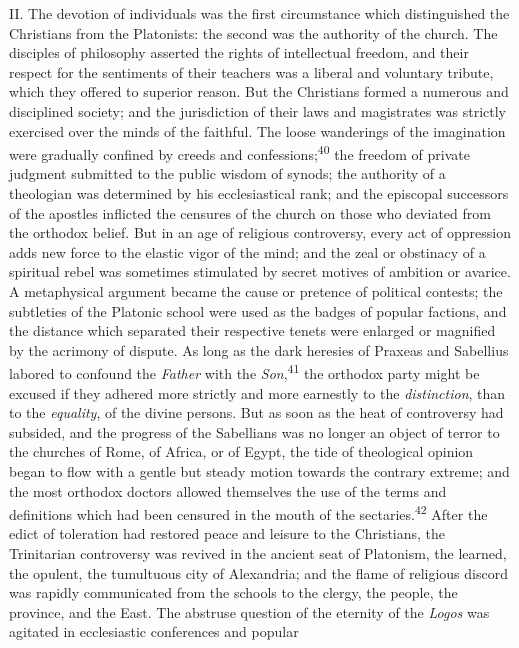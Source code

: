 II. The devotion of individuals was the first circumstance which
distinguished the Christians from the Platonists: the second was
the authority of the church. The disciples of philosophy asserted
the rights of intellectual freedom, and their respect for the
sentiments of their teachers was a liberal and voluntary tribute,
which they offered to superior reason. But the Christians formed
a numerous and disciplined society; and the jurisdiction of their
laws and magistrates was strictly exercised over the minds of the
faithful. The loose wanderings of the imagination were gradually
confined by creeds and confessions;\textsuperscript{40} the freedom of private
judgment submitted to the public wisdom of synods; the authority
of a theologian was determined by his ecclesiastical rank; and
the episcopal successors of the apostles inflicted the censures
of the church on those who deviated from the orthodox belief. But
in an age of religious controversy, every act of oppression adds
new force to the elastic vigor of the mind; and the zeal or
obstinacy of a spiritual rebel was sometimes stimulated by secret
motives of ambition or avarice. A metaphysical argument became
the cause or pretence of political contests; the subtleties of
the Platonic school were used as the badges of popular factions,
and the distance which separated their respective tenets were
enlarged or magnified by the acrimony of dispute. As long as the
dark heresies of Praxeas and Sabellius labored to confound the
\textit{Father} with the \textit{Son},\textsuperscript{41} the orthodox party might be excused
if they adhered more strictly and more earnestly to the
\textit{distinction}, than to the \textit{equality}, of the divine persons. But
as soon as the heat of controversy had subsided, and the progress
of the Sabellians was no longer an object of terror to the
churches of Rome, of Africa, or of Egypt, the tide of theological
opinion began to flow with a gentle but steady motion towards the
contrary extreme; and the most orthodox doctors allowed
themselves the use of the terms and definitions which had been
censured in the mouth of the sectaries.\textsuperscript{42} After the edict of
toleration had restored peace and leisure to the Christians, the
Trinitarian controversy was revived in the ancient seat of
Platonism, the learned, the opulent, the tumultuous city of
Alexandria; and the flame of religious discord was rapidly
communicated from the schools to the clergy, the people, the
province, and the East. The abstruse question of the eternity of
the \textit{Logos} was agitated in ecclesiastic conferences and popular
